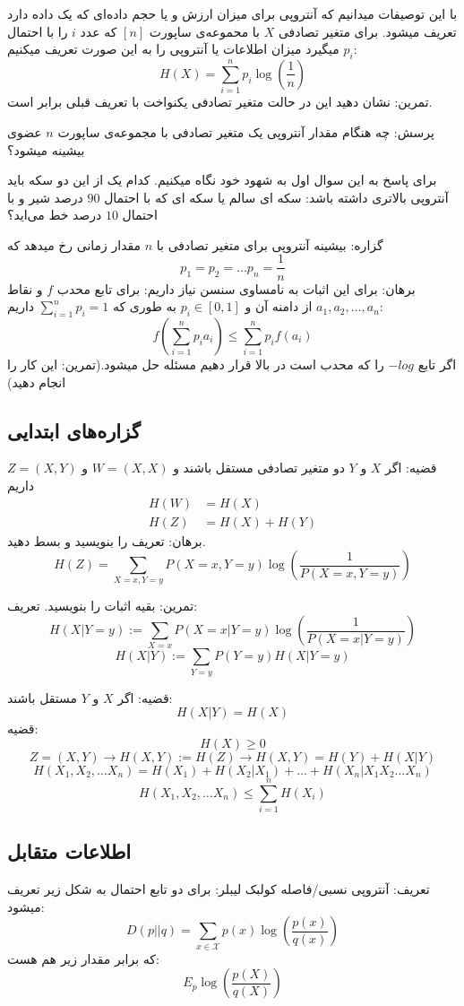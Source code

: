 با این توصیفات میدانیم که آنتروپی برای میزان ارزش و یا حجم داده‌ای که یک داده دارد تعریف میشود. برای متغیر تصادفی
$X$
با محموعه‌ی ساپورت
$[n]$
که عدد
$i$
را با احتمال
$p_i$
میگیرد میزان اطلاعات یا آنتروپی را به این صورت تعریف میکنیم:
$$H(X) = \sum_{i = 1}^{n} p_i \log(\frac{1}{n})$$
تمرین: نشان دهید این در حالت متغیر تصادفی یکنواخت با تعریف قبلی برابر است.

پرسش: چه هنگام مقدار آنتروپی یک متغیر تصادفی با مجموعه‌ی ساپورت
$n$
عضوی بیشینه میشود؟

برای پاسخ به این سوال اول به شهود خود نگاه میکنیم. کدام یک از این دو سکه باید آنتروپی بالاتری داشته باشد: سکه ای سالم یا سکه ای که با احتمال
$90$
درصد شیر و با احتمال
$10$
درصد خط می‌اید؟

گزاره: بیشینه آنتروپی برای متغیر تصادفی با
$n$
مقدار زمانی رخ میدهد که
$$p_1 = p_2 = \dots p_n = \frac{1}{n}$$
برهان: برای این اثبات به نامساوی سنسن نیاز داریم: برای تابع محدب
$f$
و نقاط
$a_1, a_2, \dots, a_n$
از دامنه آن و
$p_i \in [0, 1]$
به طوری که
$\sum_{i = 1}^{n} p_i = 1$
داریم:
$$f(\sum_{i = 1}^{n} p_i a_i) \leq \sum_{i = 1}^{n} p_i f(a_i)$$
اگر تابع
$- log$
را که محدب است در بالا قرار دهیم مسئله حل میشود.(تمرین: این کار را انجام دهید)

\subsection{گزاره‌های ابتدایی}

قضیه: اگر
$X$
و
$Y$
دو متغیر تصادفی مستقل باشند و
$W = (X, X)$
و
$Z = (X, Y)$
داریم
\begin{align*}
    H(W) &= H(X) \\
    H(Z) &= H(X) + H(Y)
\end{align*}
برهان: تعریف را بنویسید و بسط دهید.
$$H(Z) = \sum_{X = x, Y = y} P(X = x, Y = y) \log(\frac{1}{ P(X = x, Y = y)})$$

تمرین: بقیه اثبات را بنویسید.
تعریف:
$$H(X | Y = y) := \sum_{X = x} P(X = x| Y = y) \log(\frac{1}{P(X = x| Y = y)})$$
$$H(X|Y) := \sum_{Y = y} P(Y = y) H(X | Y = y)$$

قضیه: اگر
$X$
و
$Y$
مستقل باشند:
$$H(X|Y) = H(X)$$
قضیه:
$$H(X) \geq 0$$
$$Z = (X, Y) \rightarrow H(X, Y) := H(Z) \rightarrow H(X, Y) = H(Y) + H(X|Y) $$
$$H(X_1, X_2, \dots X_n) = H(X_1) + H(X_2 | X_1) + \dots + H(X_n | X_1 X_2 \dots X_n)$$
$$H(X_1, X_2, \dots X_n) \leq \sum_{i = 1}^{n} H(X_i)$$

\subsection{اطلاعات متقابل}
تعریف: آنتروپی نسبی/فاصله کولبک لیبلر: برای دو تابع احتمال به شکل زیر تعریف میشود:
$$
D(p||q) = \sum_{x \in \mathcal{X}} p(x) \log(\dfrac{p(x)}{q(x)})
$$
که برابر مقدار زیر هم هست:
$$E_p \log(\dfrac{p(X)}{q(X)})$$


